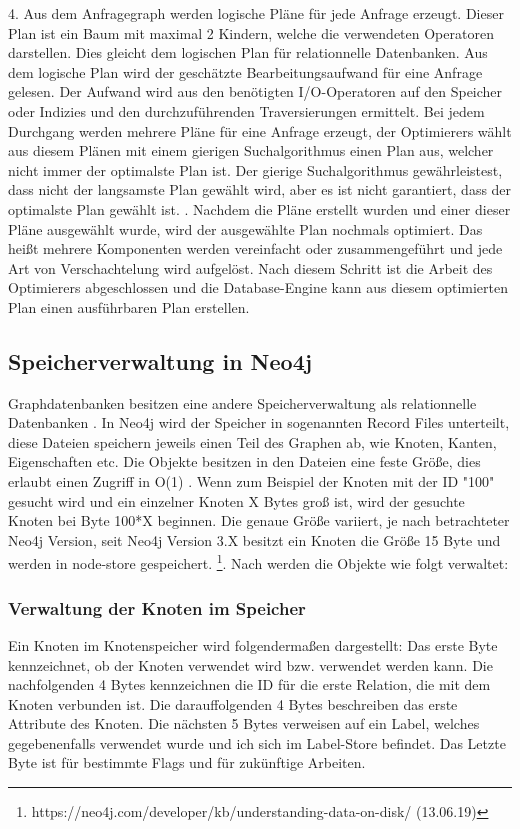 4. Aus dem Anfragegraph werden logische Pläne für jede Anfrage erzeugt. Dieser Plan ist ein Baum mit maximal 2 Kindern, welche die verwendeten Operatoren darstellen. Dies gleicht dem logischen Plan für relationnelle Datenbanken. Aus dem logische Plan wird der geschätzte Bearbeitungsaufwand für eine Anfrage gelesen. Der Aufwand wird aus den benötigten I/O-Operatoren auf den Speicher oder Indizies und den durchzuführenden Traversierungen ermittelt. Bei jedem Durchgang werden mehrere Pläne für eine Anfrage erzeugt, der Optimierers wählt aus diesem Plänen mit einem gierigen Suchalgorithmus einen Plan aus, welcher nicht immer der optimalste Plan ist. Der gierige Suchalgorithmus gewährleistest, dass nicht der langsamste Plan gewählt wird, aber es ist nicht garantiert, dass der optimalste Plan gewählt ist. \newline {}. Nachdem die Pläne erstellt wurden und einer dieser Pläne ausgewählt wurde, wird der ausgewählte Plan nochmals optimiert. Das heißt mehrere Komponenten werden vereinfacht oder zusammengeführt und jede Art von Verschachtelung wird aufgelöst. \newline \newline
Nach diesem Schritt  ist die Arbeit des Optimierers abgeschlossen und die Database-Engine kann aus diesem optimierten Plan einen ausführbaren Plan erstellen. 

\subsection{Speicherverwaltung in Neo4j}
Graphdatenbanken besitzen eine andere Speicherverwaltung als relationnelle Datenbanken \parencite{angles2012comparison}. In Neo4j wird der Speicher in sogenannten Record Files unterteilt, diese Dateien speichern jeweils einen Teil des Graphen ab, wie Knoten, Kanten, Eigenschaften etc. Die Objekte besitzen in den Dateien eine feste Größe, dies erlaubt einen Zugriff in O(1) \parencite{robinson2013graph}. Wenn zum Beispiel der Knoten mit der ID "100" gesucht wird und ein einzelner Knoten X Bytes groß ist, wird der gesuchte Knoten bei Byte 100*X beginnen. Die genaue Größe  variiert, je nach betrachteter Neo4j Version, seit Neo4j Version 3.X besitzt ein Knoten die Größe 15 Byte und werden in node-store gespeichert. \footnote{https://neo4j.com/developer/kb/understanding-data-on-disk/ (13.06.19)}. Nach \parencite{robinson2013graph} werden die Objekte wie folgt verwaltet:
\subsubsection{Verwaltung der Knoten im Speicher}
Ein Knoten im Knotenspeicher wird folgendermaßen dargestellt: Das erste Byte kennzeichnet, ob der Knoten verwendet wird bzw. verwendet werden kann. Die nachfolgenden 4 Bytes kennzeichnen die ID für die erste Relation, die mit dem Knoten verbunden ist. Die darauffolgenden 4 Bytes beschreiben das erste Attribute des Knoten. Die nächsten 5 Bytes verweisen auf ein Label, welches gegebenenfalls verwendet wurde und ich sich im Label-Store befindet. Das Letzte Byte ist für bestimmte Flags und für zukünftige Arbeiten. 

